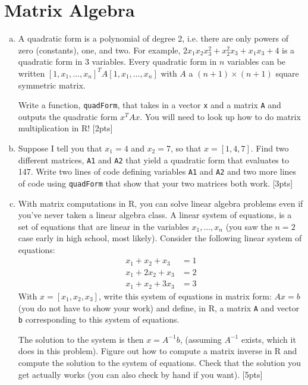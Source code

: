 \documentclass[12pt]{article}
\begin{document}
\section{Matrix Algebra}

\begin{enumerate}[(a)]
	\item A quadratic form is a polynomial of degree 2, i.e. there are only powers of zero (constants), one, and two. For example, $2x_1x_2x_3^2 + x_2^2x_3 + x_1x_3 + 4$ is a quadratic form in 3 variables. Every quadratic form in $n$ variables can be written $[1,x_1,\ldots,x_n]^T A [1,x_1,\ldots,x_n]$ with $A$ a $(n+1) \times (n+1)$ square symmetric matrix.
	
	Write a function, \verb|quadForm|, that takes in a vector \verb|x| and a matrix \verb|A| and outputs the quadratic form $x^T A x$. You will need to look up how to do matrix multiplication in R! [2pts]
	\item Suppose I tell you that $x_1 = 4$ and $x_2 = 7$, so that $x = [1,4,7]$. Find two different matrices, \verb|A1| and \verb|A2| that yield a quadratic form that evaluates to 147. Write two lines of code defining variables \verb|A1| and \verb|A2| and two more lines of code using \verb|quadForm| that show that your two matrices both work. [3pts]
	\item With matrix computations in R, you can solve linear algebra problems even if you've never taken a linear algebra class. A linear system of equations, is a set of equations that are linear in the variables $x_1,\ldots,x_n$ (you saw the $n=2$ case early in high school, most likely). Consider the following linear system of equations:
	\begin{align*}
	x_1 + x_2 + x_3 &= 1 \\
	x_1 + 2x_2 + x_3 &= 2 \\
	x_1 + x_2 + 3x_3 &= 3
	\end{align*}
	With $x = [x_1,x_2,x_3]$, write this system of equations in matrix form: $Ax = b$ (you do not have to show your work) and define, in R, a matrix \verb|A| and vector \verb|b| corresponding to this system of equations.
	
	The solution to the system is then $x = A^{-1}b$, (assuming $A^{-1}$ exists, which it does in this problem). Figure out how to compute a matrix inverse in R and compute the solution to the system of equations. Check that the solution you get actually works (you can also check by hand if you want). [5pts]
\end{enumerate}
\end{document}
